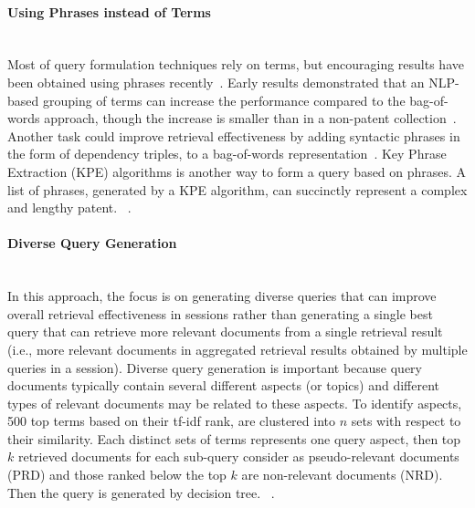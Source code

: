 \paragraph{Using Phrases instead of Terms}
\ \\
Most of query formulation techniques rely on terms, but encouraging results have been obtained using phrases recently~\citep{becks2010phrases}. Early results demonstrated that an NLP-based grouping of terms can increase the performance compared to the bag-of-words approach, though the increase is smaller than in a non-patent collection~\citep{osborn1997evaluating}. Another task could improve retrieval effectiveness by adding syntactic phrases in the form of dependency triples, to a bag-of-words representation~\citep{d2011combining}. Key Phrase Extraction (KPE) algorithms is another way to form a query based on phrases. A list of phrases, generated by a KPE algorithm, can succinctly represent a complex and lengthy patent. ~\citep{verma2011applying}.

\paragraph{Diverse Query Generation}
\ \\
In this approach, the focus is on generating diverse queries that can improve overall retrieval effectiveness in sessions rather than generating a single best query that can retrieve more relevant documents from a single retrieval result (i.e., more relevant documents in aggregated retrieval results obtained by multiple queries in a session). Diverse query generation is important because query documents typically contain several different aspects (or topics) and different types of relevant documents may be related to these aspects. To identify aspects, 500 top terms based on their tf-idf rank, are clustered into $ n $ sets with respect to their similarity. Each distinct sets of terms represents one query aspect, then top $ k $ retrieved documents for each sub-query consider as pseudo-relevant documents (PRD) and those ranked below the top $ k $ are non-relevant documents (NRD). Then the query is generated by decision tree. ~\citep{kim2014searching, kim2014diversifying}.